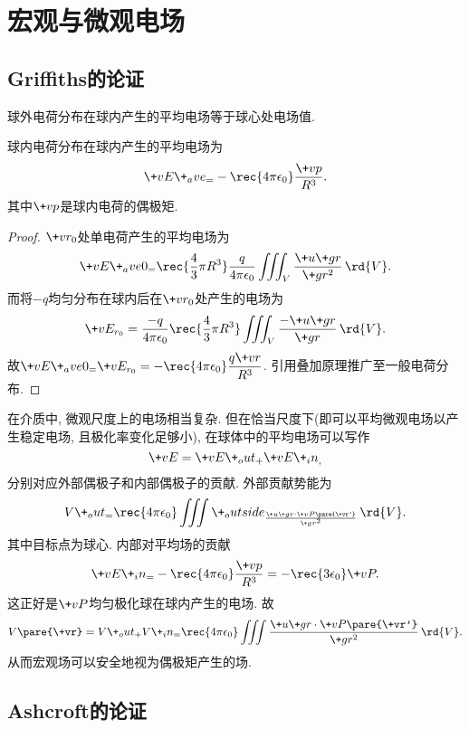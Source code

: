 \documentclass[hidelinks]{ctexart}
\begin{document}
\section{宏观与微观电场} %
\label{sec:宏观与微观电场}

\subsection{Griffiths的论证} %
\label{sub:griffiths的论证}

\begin{theorem}
    球外电荷分布在球内产生的平均电场等于球心处电场值.
\end{theorem}
\begin{theorem}
    球内电荷分布在球内产生的平均电场为
    \[ \+vE\+_ave_ = -\rec{4\pi\epsilon_0}\frac{\+vp}{R^3}. \]
    其中$\+vp$是球内电荷的偶极矩.
\end{theorem}
\begin{proof}
    $\+vr_0$处单电荷产生的平均电场为
    \[ \+vE\+_ave0_ = \rec{\displaystyle \frac{4}{3}\pi R^3}\frac{q}{4\pi\epsilon_0}\iiint_V \frac{\+u{\+gr}}{\+gr^2}\, \rd{V}. \]
    而将$-q$均匀分布在球内后在$\+vr_0$处产生的电场为
    \[ \+vE_{r_0} = \frac{-q}{4\pi\epsilon_0} \rec{\displaystyle \frac{4}{3}\pi R^3} \iiint_V \frac{-\+u{\+gr}}{\+gr}\, \rd{V}. \]
    故$\displaystyle \+vE\+_ave0_ = \+vE_{r_0} = -\rec{4\pi\epsilon_0}\frac{q\+vr}{R^3}$. 引用叠加原理推广至一般电荷分布.
\end{proof}
在介质中, 微观尺度上的电场相当复杂. 但在恰当尺度下(即可以平均微观电场以产生稳定电场, 且极化率变化足够小), 在球体中的平均电场可以写作
\[ \+vE = \+vE\+_out_ + \+vE\+_in_, \]
分别对应外部偶极子和内部偶极子的贡献. 外部贡献势能为
\[ V\+_out_ = \rec{4\pi\epsilon_0} \iiint\+_outside_ \frac{\+u{\+gr}\cdot\+vP\pare{\+vr'}}{\+gr^2}\,\rd{V}. \]
其中目标点为球心. 内部对平均场的贡献
\[ \+vE\+_in_ = -\rec{4\pi\epsilon_0} \frac{\+vp}{R^3} = -\rec{3\epsilon_0}\+vP. \]
这正好是$\+vP$均匀极化球在球内产生的电场. 故
\[ V\pare{\+vr} = V\+_out_ + V\+_in_ = \rec{4\pi\epsilon_0} \iiint \frac{\+u{\+gr}\cdot\+vP\pare{\+vr'}}{\+gr^2}\,\rd{V}. \]
从而宏观场可以安全地视为偶极矩产生的场.


\subsection{Ashcroft的论证} %
\label{sub:ashcroft的论证}
\end{document}
